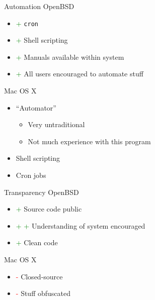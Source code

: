 \documentclass{beamer}
\newcommand{\good}{\textcolor{green}{+ }}
\newcommand{\bad}{\textcolor{red}{- }}
\begin{document}
			\begin{frame}{Automation}
				OpenBSD
				\begin{itemize}
					\item \good \texttt{cron}
					\item \good Shell scripting
					\item \good Manuals available within system
					\item \good All users encouraged to automate stuff
				\end{itemize}
				Mac OS X
				\begin{itemize}
					\item ``Automator''
					\begin{itemize}
						\item Very untraditional
						\item Not much experience with this program
					\end{itemize}
					\item Shell scripting
					\item Cron jobs
				\end{itemize}
			\end{frame}
			\begin{frame}{Transparency}
				OpenBSD
				\begin{itemize}
					\item \good Source code public
					\item \good \good Understanding of system encouraged
					\item \good Clean code
				\end{itemize}
				Mac OS X
				\begin{itemize}
					\item \bad Closed-source
					\item \bad Stuff obfuscated
				\end{itemize}
			\end{frame}
\end{document}
